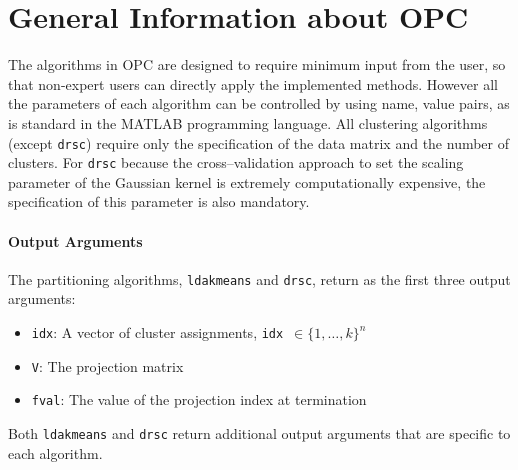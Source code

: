 \documentclass{book}
\begin{document}

\chapter{General Information about OPC}

The algorithms in OPC are designed to require minimum input from the user, so
that non-expert users can directly apply the implemented methods.  However all
the parameters of each algorithm can be controlled by using name, value pairs,
as is standard in the MATLAB programming language.
%
All clustering algorithms (except {\tt drsc}) require only the specification
of the data matrix and the number of clusters. For {\tt drsc} because the
cross--validation approach to set the scaling parameter of the Gaussian
kernel is extremely computationally expensive, the specification of this parameter
is also mandatory.


%
%
%
\subsubsection*{Output Arguments}

The partitioning algorithms, {\tt ldakmeans} and {\tt drsc}, return as the
first three output arguments:
%
\begin{itemize}

\item[] {\tt idx}: A vector of cluster assignments, {\tt idx}~$\in \{1,\ldots,k\}^n$

\item[] {\tt V}: The projection matrix

\item[] {\tt fval}: The value of the projection index at termination 

\end{itemize}
%
Both {\tt ldakmeans} and {\tt drsc} return additional output arguments that are
specific to each algorithm.
\end{document}
